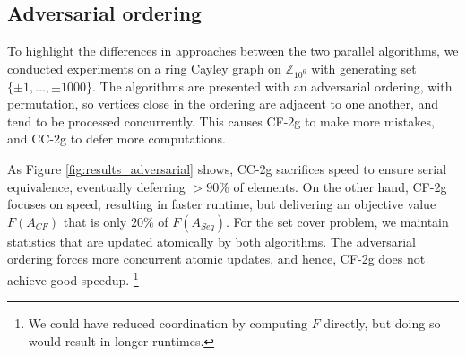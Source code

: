 \documentclass{article} %
\newcommand{\hogwild}{CF-2g}
\newcommand{\occ}{CC-2g}
\newcommand{\hogwildshort}{CF}
\newcommand{\seqalgshort}{Seq}
\begin{document}
\subsection{Adversarial ordering}

To highlight the differences in approaches between the two parallel algorithms, we conducted experiments on a ring Cayley graph on $\mathbb{Z}_{10^6}$ with generating set $\{\pm 1,\dots, \pm 1000\}$.
The algorithms are presented with an adversarial ordering, with permutation, so vertices close in the ordering are adjacent to one another, and tend to be processed concurrently.
This causes \hogwild{} to make more mistakes, and \occ{} to defer more computations.

As Figure \ref{fig:results_adversarial} shows, \occ{}  sacrifices speed to ensure serial equivalence, eventually deferring $>90\%$ of elements.
On the other hand, \hogwild{} focuses on speed, resulting in faster runtime, but delivering an objective value $F(A_{\hogwildshort{}})$ that is only $20\%$ of $F(A_{\seqalgshort{}})$.
For the set cover problem, we maintain statistics that are updated atomically by both algorithms.
The adversarial ordering forces more concurrent atomic updates, and hence, \hogwild{} does not achieve good speedup.
\footnote{We could have reduced coordination by computing $F$ directly, but doing so would result in longer runtimes.}
\end{document}
